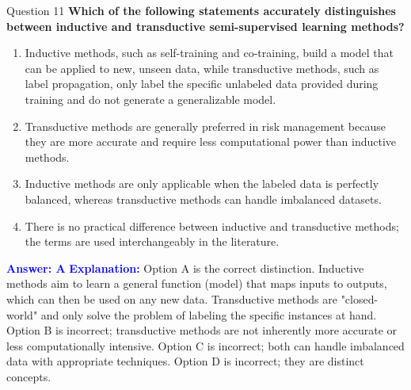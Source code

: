 \documentclass{beamer}
\begin{document}
	\begin{frame}{Question 11}
		\textbf{Which of the following statements accurately distinguishes between inductive and transductive semi-supervised learning methods?}
		\begin{enumerate}
			\item Inductive methods, such as self-training and co-training, build a model that can be applied to new, unseen data, while transductive methods, such as label propagation, only label the specific unlabeled data provided during training and do not generate a generalizable model.
			\item Transductive methods are generally preferred in risk management because they are more accurate and require less computational power than inductive methods.
			\item Inductive methods are only applicable when the labeled data is perfectly balanced, whereas transductive methods can handle imbalanced datasets.
			\item There is no practical difference between inductive and transductive methods; the terms are used interchangeably in the literature.
		\end{enumerate}
		\vspace{0.2cm}
		\textcolor{blue}{\textbf{Answer: A}}
		\vspace{0.2cm}
		\textcolor{blue}{\textbf{Explanation:}} Option A is the correct distinction. Inductive methods aim to learn a general function (model) that maps inputs to outputs, which can then be used on any new data. Transductive methods are "closed-world" and only solve the problem of labeling the specific instances at hand. Option B is incorrect; transductive methods are not inherently more accurate or less computationally intensive. Option C is incorrect; both can handle imbalanced data with appropriate techniques. Option D is incorrect; they are distinct concepts.
	\end{frame}
	
\end{document}
